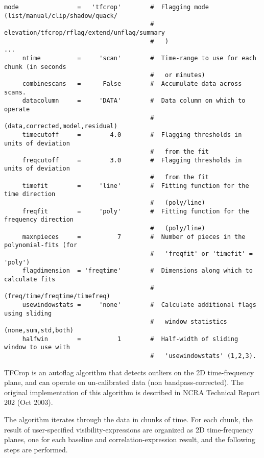 \small
\begin{verbatim}
mode                =   'tfcrop'        #  Flagging mode (list/manual/clip/shadow/quack/
                                        #   elevation/tfcrop/rflag/extend/unflag/summary
                                        #   )
...
     ntime          =     'scan'        #  Time-range to use for each chunk (in seconds
                                        #   or minutes)
     combinescans   =      False        #  Accumulate data across scans.
     datacolumn     =     'DATA'        #  Data column on which to operate
                                        #   (data,corrected,model,residual)
     timecutoff     =        4.0        #  Flagging thresholds in units of deviation
                                        #   from the fit
     freqcutoff     =        3.0        #  Flagging thresholds in units of deviation
                                        #   from the fit
     timefit        =     'line'        #  Fitting function for the time direction
                                        #   (poly/line)
     freqfit        =     'poly'        #  Fitting function for the frequency direction
                                        #   (poly/line)
     maxnpieces     =          7        #  Number of pieces in the polynomial-fits (for
                                        #   'freqfit' or 'timefit' = 'poly')
     flagdimension  = 'freqtime'        #  Dimensions along which to calculate fits
                                        #   (freq/time/freqtime/timefreq)
     usewindowstats =     'none'        #  Calculate additional flags using sliding
                                        #   window statistics (none,sum,std,both)
     halfwin        =          1        #  Half-width of sliding window to use with
                                        #   'usewindowstats' (1,2,3).
\end{verbatim}
\normalsize

TFCrop is an autoflag algorithm that detects outliers on the 2D
time-frequency plane, and can operate on un-calibrated data (non
bandpass-corrected). The original implementation of this algorithm is
described in NCRA Technical Report 202 (Oct 2003).

The algorithm iterates through the data in chunks of time. For each
chunk, the result of user-specified visibility-expressions are
organized as 2D time-frequency planes, one for each baseline and
correlation-expression result, and the following steps are performed.

